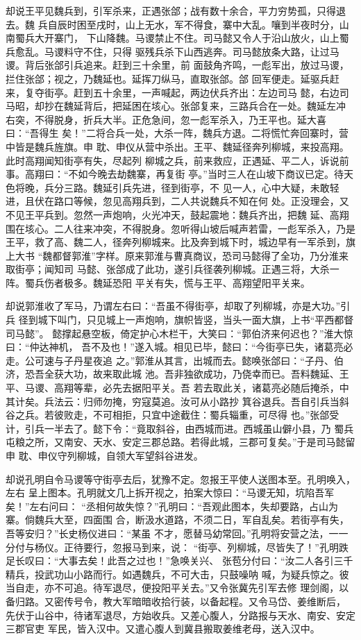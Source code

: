 却说王平见魏兵到，引军杀来，正遇张郃；战有数十余合，平力穷势孤，只得退去。魏
兵自辰时困至戌时，山上无水，军不得食，寨中大乱。嚷到半夜时分，山南蜀兵大开寨门，
下山降魏。马谡禁止不住。司马懿又令人于沿山放火，山上蜀兵愈乱。马谡料守不住，只得
驱残兵杀下山西逃奔。司马懿放条大路，让过马谡。背后张郃引兵追来。赶到三十余里，前
面鼓角齐鸣，一彪军出，放过马谡，拦住张郃；视之，乃魏延也。延挥刀纵马，直取张郃。郃
回军便走。延驱兵赶来，复夺街亭。赶到五十余里，一声喊起，两边伏兵齐出：左边司马
懿，右边司马昭，却抄在魏延背后，把延困在垓心。张郃复来，三路兵合在一处。魏延左冲
右突，不得脱身，折兵大半。正危急间，忽一彪军杀入，乃王平也。延大喜曰：“吾得生
矣！”二将合兵一处，大杀一阵，魏兵方退。二将慌忙奔回寨时，营中皆是魏兵旌旗。申
耽、申仪从营中杀出。王平、魏延径奔列柳城，来投高翔。此时高翔闻知街亭有失，尽起列
柳城之兵，前来救应，正遇延、平二人，诉说前事。高翔曰：“不如今晚去劫魏寨，再复街
亭。”当时三人在山坡下商议已定。待天色将晚，兵分三路。魏延引兵先进，径到街亭，不
见一人，心中大疑，未敢轻进，且伏在路口等候，忽见高翔兵到，二人共说魏兵不知在何
处。正没理会，又不见王平兵到。忽然一声炮响，火光冲天，鼓起震地：魏兵齐出，把魏
延、高翔围在垓心。二人往来冲突，不得脱身。忽听得山坡后喊声若雷，一彪军杀入，乃是
王平，救了高、魏二人，径奔列柳城来。比及奔到城下时，城边早有一军杀到，旗上大书
“魏都督郭淮”字样。原来郭淮与曹真商议，恐司马懿得了全功，乃分淮来取街亭；闻知司
马懿、张郃成了此功，遂引兵径袭列柳城。正遇三将，大杀一阵。蜀兵伤者极多。魏延恐阳
平关有失，慌与王平、高翔望阳平关来。

却说郭淮收了军马，乃谓左右曰：“吾虽不得街亭，却取了列柳城，亦是大功。”引兵
径到城下叫门，只见城上一声炮响，旗帜皆竖，当头一面大旗，上书“平西都督司马懿”。
懿撑起悬空板，倚定护心木栏干，大笑曰：“郭伯济来何迟也？”淮大惊曰：“仲达神机，
吾不及也！”遂入城。相见已毕，懿曰：“今街亭已失，诸葛亮必走。公可速与子丹星夜追
之。”郭淮从其言，出城而去。懿唤张郃曰：“子丹、伯济，恐吾全获大功，故来取此城
池。吾非独欲成功，乃侥幸而已。吾料魏延、王平、马谡、高翔等辈，必先去据阳平关。吾
若去取此关，诸葛亮必随后掩杀，中其计矣。兵法云：归师勿掩，穷寇莫追。汝可从小路抄
箕谷退兵。吾自引兵当斜谷之兵。若彼败走，不可相拒，只宜中途截住：蜀兵辎重，可尽得
也。”张郃受计，引兵一半去了。懿下令：“竟取斜谷，由西城而进。西城虽山僻小县，乃
蜀兵屯粮之所，又南安、天水、安定三郡总路。若得此城，三郡可复矣。”于是司马懿留申
耽、申仪守列柳城，自领大军望斜谷进发。

却说孔明自令马谡等守街亭去后，犹豫不定。忽报王平使人送图本至。孔明唤入，左右
呈上图本。孔明就文几上拆开视之，拍案大惊曰：“马谡无知，坑陷吾军矣！”左右问曰：
“丞相何故失惊？”孔明曰：“吾观此图本，失却要路，占山为寨。倘魏兵大至，四面围
合，断汲水道路，不须二日，军自乱矣。若街亭有失，吾等安归？”长史杨仪进曰：“某虽
不才，愿替马幼常回。”孔明将安营之法，一一分付与杨仪。正待要行，忽报马到来，说：
“街亭、列柳城，尽皆失了！”孔明跌足长叹曰：“大事去矣！此吾之过也！”急唤关兴、
张苞分付曰：“汝二人各引三千精兵，投武功山小路而行。如遇魏兵，不可大击，只鼓噪呐
喊，为疑兵惊之。彼当自走，亦不可追。待军退尽，便投阳平关去。”又令张冀先引军去修
理剑阁，以备归路。又密传号令，教大军暗暗收拾行装，以备起程。又令马岱、姜维断后，
先伏于山谷中，待诸军退尽，方始收兵。又差心腹人，分路报与天水、南安、安定三郡官吏
军民，皆入汉中。又遣心腹人到冀县搬取姜维老母，送入汉中。

